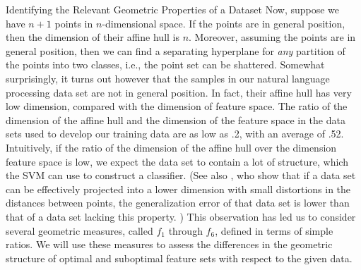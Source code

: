 \documentclass{llncs}
\begin{document}
\begin{section}{Identifying the Relevant Geometric Properties of a Dataset}
Now, suppose we have $n+1$ points in $n$-dimensional space. If the points are in general position, then the dimension of their affine hull is $n$. Moreover, assuming the points are in general position, then we can find a separating hyperplane for {\em any} partition of the points into two classes, i.e., the point set can be shattered. Somewhat surprisingly, it turns out however that the samples in our natural language processing data set are not in general position. In fact, their affine hull has very low dimension, compared with the dimension of feature space. The ratio of the dimension of the affine hull and the dimension of the feature space in the data sets used to develop our training data are as low as .2, with an average of .52. Intuitively, if the ratio of the dimension of the affine hull over the dimension feature space is low, we expect the data set to contain a lot of structure, which the SVM can use to construct a classifier. (See also \cite{Garg,Bradley}, who show that if a data set can be effectively projected into a lower dimension with small distortions in the distances between points, the generalization error of that data set is lower than that of a data set lacking this property. ) This observation has led us to consider several geometric measures, called $f_1$ through $f_6$, defined in terms of simple ratios. We will use these measures to assess the differences in the geometric structure of optimal and suboptimal feature sets with respect to the given data. 


\end{section}
\end{document}
